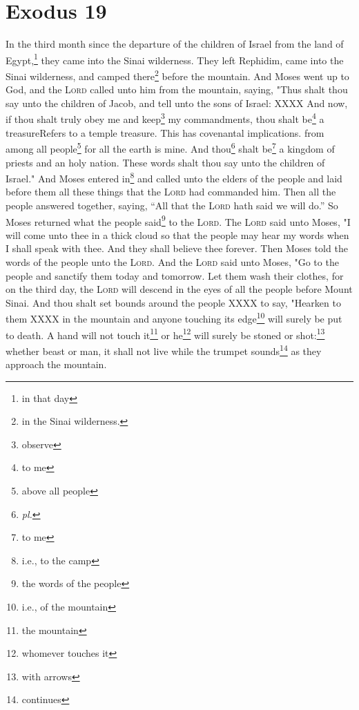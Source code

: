 \section{Exodus 19}\label{exodus:19}
\begin{enumerate}
     In the third month since the departure of the children of Israel from the land of Egypt,\footnote{in that day} they came into the Sinai wilderness.%
     They left Rephidim, came into the Sinai wilderness, and camped there\footnote{in the Sinai wilderness.} before the mountain.%
     And Moses went up to God, and the \textsc{Lord} called unto him from the mountain, saying, "Thus shalt thou say unto the children of Jacob, and tell unto the sons of Israel:%
     XXXX%
     And now, if thou shalt truly obey me and keep\footnote{observe} my commandments, thou shalt be\footnote{to me} a treasure{Refers to a temple treasure. This has covenantal implications.} from among all people\footnote{above all people} for all the earth is mine.%
     And thou\footnote{\emph{pl.}} shalt be\footnote{to me} a kingdom of priests and an holy nation. These words shalt thou say unto the children of Israel."%
     And Moses entered in\footnote{i.e., to the camp} and called unto the elders of the people and laid before them all these things that the \textsc{Lord} had commanded him.%
     Then all the people answered together, saying, ``All that the \textsc{Lord} hath said we will do.'' So Moses returned what the people said\footnote{the words of the people} to the \textsc{Lord}.%
     The \textsc{Lord} said unto Moses, "I will come unto thee in a thick cloud so that the people may hear my words when I shall speak with thee. And they shall believe thee forever. Then Moses told the words of the people unto the \textsc{Lord}.%
     And the \textsc{Lord} said unto Moses, "Go to the people and sanctify them today and tomorrow. Let them wash their clothes,%
     for on the third day, the \textsc{Lord} will descend in the eyes of all the people before Mount Sinai.%
     And thou shalt set bounds around the people XXXX to say, "Hearken to them XXXX in the mountain and anyone touching its edge\footnote{i.e., of the mountain} will surely be put to death.%
     A hand will not touch it\footnote{the mountain} or he\footnote{whomever touches it} will surely be stoned or shot:\footnote{with arrows} whether beast or man, it shall not live while the trumpet sounds\footnote{continues} as they approach the mountain.%

\end{enumerate}
